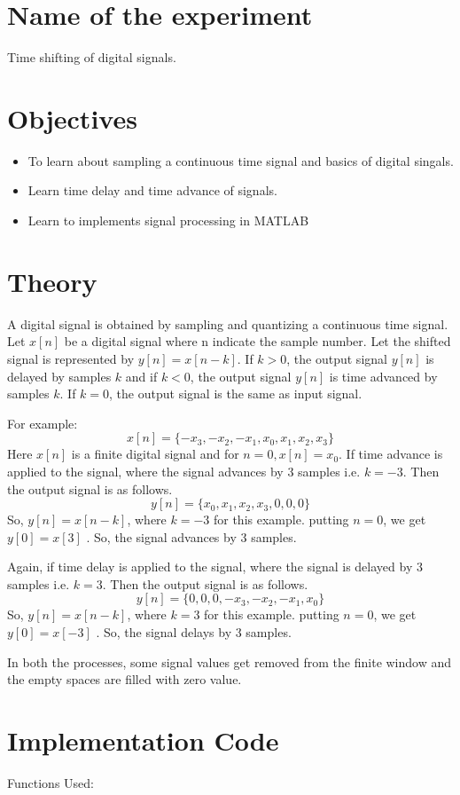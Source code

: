 \documentclass[a4paper,11pt]{article}
\begin{document}
	\section*{Name of the experiment}
	Time shifting of digital signals.
	\section*{Objectives}
	\begin{itemize}
		\item To learn about sampling a continuous time signal and basics of digital singals. 
		\item Learn time delay and time advance of signals.
		\item Learn to implements signal processing in MATLAB
	\end{itemize}
	\section*{Theory}
	A digital signal is obtained by sampling and quantizing a continuous time signal. Let $x[n]$ be a digital signal where n indicate the sample number. Let the shifted signal is represented by $ y[n] = x[n-k] $. If $ k>0 $, the output signal $y[n]$ is delayed by samples $k$ and if $k<0$, the output signal $y[n]$ is time advanced by samples $k$. If $k=0$, the output signal is the same as input signal.
	
	For example:
	$$ x[n] = \{-x_3, -x_2, -x_1, x_0, x_1, x_2, x_3\} $$
	Here $x[n]$ is a finite digital signal and for $n=0 , x[n] = x_0$. If time advance is applied to the signal, where the signal advances by 3 samples i.e. $k=-3$. Then the output signal is as follows. 
	$$ y[n] = \{x_0, x_1, x_2, x_3, 0, 0, 0\} $$
	So, $y[n] = x[n-k]$, where $k=-3$ for this example. putting $n=0$, we get $y[0] = x[3]$ . So, the signal advances by 3 samples. 
	
	Again, if time delay is applied to the signal, where the signal is delayed by 3 samples i.e. $k=3$. Then the output signal is as follows. 
	$$ y[n] = \{0, 0, 0, -x_3, -x_2, -x_1, x_0\} $$
	So, $y[n] = x[n-k]$, where $k=3$ for this example. putting $n=0$, we get $y[0] = x[-3]$ . So, the signal delays by 3 samples. 
	
	In both the processes, some signal values get removed from the finite window and the empty spaces are filled with zero value.
		
	\vfill
	
	\section*{Implementation Code}  
	\captionsetup{labelformat=empty,labelsep=none}
	
	\vspace{1.5cm}
	\large Functions Used:
	
	
	
	
	
\end{document}
